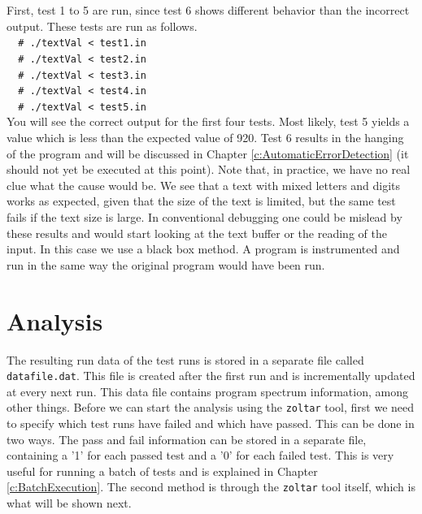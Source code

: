 	First, test 1 to 5 are run, since test 6 shows different behavior than the incorrect output.
	These tests are run as follows.\\
	\verb|  # ./textVal < test1.in|\\
	\verb|  # ./textVal < test2.in|\\
	\verb|  # ./textVal < test3.in|\\
	\verb|  # ./textVal < test4.in|\\
	\verb|  # ./textVal < test5.in|\\
	You will see the correct output for the first four tests.
	Most likely, test 5 yields a value which is less than the expected value of 920.
	Test 6 results in the hanging of the program and will be discussed
	in Chapter \ref{c:AutomaticErrorDetection} (it should not yet be executed at this point).
	Note that, in practice, we have no real clue what the cause would be.
	We see that a text with mixed letters and digits works as expected,
	given that the size of the text is limited, but the same test fails if the text size is large.
	In conventional debugging one could be mislead by these results and would start looking at
	the text buffer or the reading of the input.
	In this case we use a black box method.
	A program is instrumented and run in the same way the original program would have been run.
	
	
\section{Analysis}

	The resulting run data of the test runs is stored in a separate file called \verb|datafile.dat|.
	This file is created after the first run and is incrementally updated at every next run.
	This data file contains program spectrum information, among other things.
	Before we can start the analysis using the \verb|zoltar| tool,
	first we need to specify which test runs have failed and which have passed.
	This can be done in two ways.
	The pass and fail information can be stored in a separate file, 
	containing a '1' for each passed test and a '0' for each failed test.
	This is very useful for running a batch of tests and is explained in Chapter \ref{c:BatchExecution}.
	The second method is through the \verb|zoltar| tool itself, 
	which is what will be shown next.
	
